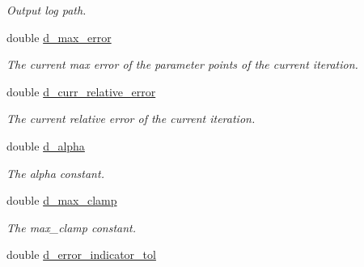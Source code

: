 \begin{DoxyCompactItemize}
\begin{DoxyCompactList}\small\item\em Output log path. \end{DoxyCompactList}\item 
\hypertarget{class_c_a_r_o_m_1_1_greedy_parameter_point_sampler_af3b920a1512b3162ebd6eac673327004}{double \hyperlink{class_c_a_r_o_m_1_1_greedy_parameter_point_sampler_af3b920a1512b3162ebd6eac673327004}{d\-\_\-max\-\_\-error}}\label{class_c_a_r_o_m_1_1_greedy_parameter_point_sampler_af3b920a1512b3162ebd6eac673327004}

\begin{DoxyCompactList}\small\item\em The current max error of the parameter points of the current iteration. \end{DoxyCompactList}\item 
\hypertarget{class_c_a_r_o_m_1_1_greedy_parameter_point_sampler_ab9d9f9fd40249af1455d2a24030fba6c}{double \hyperlink{class_c_a_r_o_m_1_1_greedy_parameter_point_sampler_ab9d9f9fd40249af1455d2a24030fba6c}{d\-\_\-curr\-\_\-relative\-\_\-error}}\label{class_c_a_r_o_m_1_1_greedy_parameter_point_sampler_ab9d9f9fd40249af1455d2a24030fba6c}

\begin{DoxyCompactList}\small\item\em The current relative error of the current iteration. \end{DoxyCompactList}\item 
\hypertarget{class_c_a_r_o_m_1_1_greedy_parameter_point_sampler_a134199a3862deaee417429f67115bdd1}{double \hyperlink{class_c_a_r_o_m_1_1_greedy_parameter_point_sampler_a134199a3862deaee417429f67115bdd1}{d\-\_\-alpha}}\label{class_c_a_r_o_m_1_1_greedy_parameter_point_sampler_a134199a3862deaee417429f67115bdd1}

\begin{DoxyCompactList}\small\item\em The alpha constant. \end{DoxyCompactList}\item 
\hypertarget{class_c_a_r_o_m_1_1_greedy_parameter_point_sampler_ab78f1e0885cba23ab67f660a3090ede6}{double \hyperlink{class_c_a_r_o_m_1_1_greedy_parameter_point_sampler_ab78f1e0885cba23ab67f660a3090ede6}{d\-\_\-max\-\_\-clamp}}\label{class_c_a_r_o_m_1_1_greedy_parameter_point_sampler_ab78f1e0885cba23ab67f660a3090ede6}

\begin{DoxyCompactList}\small\item\em The max\-\_\-clamp constant. \end{DoxyCompactList}\item 
\hypertarget{class_c_a_r_o_m_1_1_greedy_parameter_point_sampler_a813aaf0fd8b43d011ec6cd717b80b35d}{double \hyperlink{class_c_a_r_o_m_1_1_greedy_parameter_point_sampler_a813aaf0fd8b43d011ec6cd717b80b35d}{d\-\_\-error\-\_\-indicator\-\_\-tol}}\label{class_c_a_r_o_m_1_1_greedy_parameter_point_sampler_a813aaf0fd8b43d011ec6cd717b80b35d}


\end{DoxyCompactItemize}
